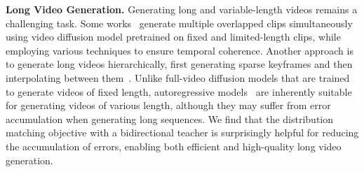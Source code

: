 \noindent\textbf{Long Video Generation.}
Generating long and variable-length videos remains a challenging task.
Some works~\cite{qiu2023freenoise,chen2023seine,zhang2023diffcollage,zhang2024avid,wang2023gen,tan2024video,wang2024zola} generate multiple overlapped clips simultaneously using video diffusion model pretrained on fixed and limited-length clips, while employing various techniques to ensure temporal coherence.
Another approach is to generate long videos hierarchically, first generating sparse keyframes and then interpolating between them~\cite{yin2023nuwa,zhao2024moviedreamer}.
Unlike full-video diffusion models that are trained to generate videos of fixed length, autoregressive models~\cite{liang2022nuwa,henschel2024streamingt2v,jin2024pyramidal,gao2024vid,xie2024progressive,wang2024loong} are inherently suitable for generating videos of various length, although they may suffer from error accumulation when generating long sequences.
We find that the distribution matching objective with a bidirectional teacher is surprisingly helpful for reducing the accumulation of errors, enabling both efficient and high-quality long video generation.
\vspace{0.5em}

